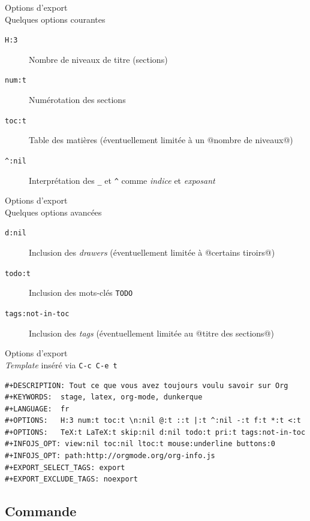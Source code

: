 \documentclass[presentation,t,hideothersubsections]{beamer}
\begin{document}
\begin{frame}[fragile,label=sec-4-1-1]{Options d'export \\ Quelques options courantes}
 \begin{description}
\item[\texttt{H:3}] \alert{Nombre de niveaux de titre} (sections)
\item[\texttt{num:t}] \alert{Numérotation des sections}
\item[\texttt{toc:t}] \alert{Table des matières} (éventuellement limitée à un @nombre de niveaux@)
\item[\texttt{\textasciicircum{}:nil}] Interprétation des \texttt{\_} et \texttt{\textasciicircum{}} comme \emph{indice} et \emph{exposant}
\end{description}
\end{frame}
\begin{frame}[fragile,label=sec-4-1-2]{Options d'export \\ Quelques options avancées}
 \begin{description}
\item[\texttt{d:nil}] Inclusion des \emph{drawers} (éventuellement limitée à @certains tiroirs@)
\item[\texttt{todo:t}] Inclusion des mots-clés \texttt{TODO}
\item[\texttt{tags:not-in-toc}] Inclusion des \emph{tags} (éventuellement limitée au @titre des
sections@)
\end{description}
\end{frame}
\begin{frame}[fragile,label=sec-4-1-3]{Options d'export \\ \emph{Template} inséré via \texttt{C-c C-e t}}
 \lstset{language=org,numbers=none}
\begin{lstlisting}
#+DESCRIPTION: Tout ce que vous avez toujours voulu savoir sur Org
#+KEYWORDS:  stage, latex, org-mode, dunkerque
#+LANGUAGE:  fr
#+OPTIONS:   H:3 num:t toc:t \n:nil @:t ::t |:t ^:nil -:t f:t *:t <:t
#+OPTIONS:   TeX:t LaTeX:t skip:nil d:nil todo:t pri:t tags:not-in-toc
#+INFOJS_OPT: view:nil toc:nil ltoc:t mouse:underline buttons:0
#+INFOJS_OPT: path:http://orgmode.org/org-info.js
#+EXPORT_SELECT_TAGS: export
#+EXPORT_EXCLUDE_TAGS: noexport
\end{lstlisting}
\end{frame}
\subsection{Commande}
\label{sec-4-2}
\end{document}

